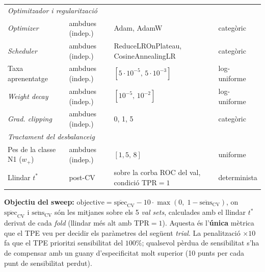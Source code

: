 \documentclass[10pt,a4paper,twocolumn,twoside]{article}
\begin{document}
\begin{table}[H]
\begin{tabular}{p{2.8cm}p{2.4cm}p{5.6cm}p{3.2cm}}
\multicolumn{4}{l}{\textit{Optimitzador i regularització}} \\[2pt]
\textit{Optimizer}      & ambdues (indep.)   & Adam, AdamW                                     & categòric \\
\textit{Scheduler}      & ambdues (indep.)   & ReduceLROnPlateau, CosineAnnealingLR            & categòric \\
Taxa aprenentatge       & ambdues (indep.)   & $[5\cdot10^{-5},\,5\cdot10^{-3}]$              & log-uniforme \\
\textit{Weight decay}   & ambdues (indep.)   & $[10^{-5},\,10^{-2}]$                           & log-uniforme \\
\textit{Grad. clipping} & ambdues (indep.)   & 0, 1, 5                                         & categòric \\
\midrule
\multicolumn{4}{l}{\textit{Tractament del desbalanceig}} \\[2pt]
Pes de la classe N1 ($w_+$) & ambdues (indep.) & $[1{,}5,\,8]$                               & uniforme \\
Llindar $t^*$           & post-CV            & sobre la corba ROC del val, condició TPR$=1$    & determinista \\
\bottomrule
\end{tabular}
\end{table}

\textbf{Objectiu del sweep:}
$\text{objective} = \overline{\text{spec}}_{\text{CV}} - 10 \cdot \max(0,\; 1 - \overline{\text{sens}}_{\text{CV}})$,
on $\overline{\text{spec}}_{\text{CV}}$ i $\overline{\text{sens}}_{\text{CV}}$ són les mitjanes
sobre els 5 \textit{val sets}, calculades amb el llindar $t^*$ derivat de cada \textit{fold}
(llindar més alt amb TPR$=1$). Aquesta és l'\textbf{única} mètrica que el TPE veu per decidir
els paràmetres del següent \textit{trial}. La penalització $\times 10$ fa que el TPE prioritzi
sensibilitat del $100\%$; qualsevol pèrdua de sensibilitat s'ha de compensar
amb un guany d'especificitat molt superior (10 punts per cada punt de sensibilitat perdut).
\end{document}
